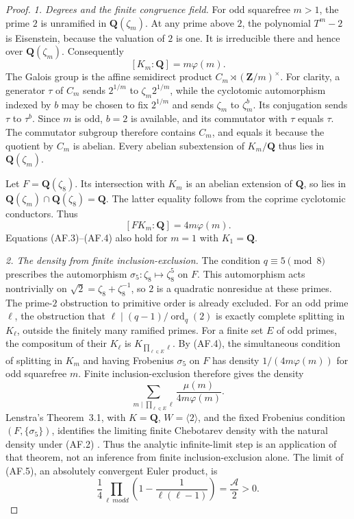 \documentclass[11pt,a4paper]{article}
\begin{document}
\begin{proof}
\emph{1. Degrees and the finite congruence field.}
For odd squarefree $m>1$, the prime $2$ is unramified in
$\mathbf Q(\zeta_m)$. At any prime above $2$, the polynomial
$T^m-2$ is Eisenstein, because the valuation of $2$ is one.
It is irreducible there and hence over $\mathbf Q(\zeta_m)$.
Consequently
\[
                         [K_m:\mathbf Q]=m\varphi(m).
                                                               \tag{AF.3}
\]
The Galois group is the affine semidirect product
$C_m\rtimes(\mathbf Z/m)^\times$. For clarity, a generator
$\tau$ of $C_m$ sends $2^{1/m}$ to $\zeta_m2^{1/m}$, while the
cyclotomic automorphism indexed by $b$ may be chosen to fix
$2^{1/m}$ and sends $\zeta_m$ to $\zeta_m^b$.
Its conjugation sends $\tau$ to $\tau^b$. Since $m$ is odd,
$b=2$ is available, and its commutator with $\tau$ equals
$\tau$. The commutator subgroup therefore contains $C_m$,
and equals it because the quotient by $C_m$ is abelian.
Every abelian subextension of $K_m/\mathbf Q$ thus lies in
$\mathbf Q(\zeta_m)$.

Let $F=\mathbf Q(\zeta_8)$. Its intersection with $K_m$ is an
abelian extension of $\mathbf Q$, so lies in
$\mathbf Q(\zeta_m)\cap\mathbf Q(\zeta_8)=\mathbf Q$.
The latter equality follows from the coprime cyclotomic conductors.
Thus
\[
                       [FK_m:\mathbf Q]=4m\varphi(m).
                                                               \tag{AF.4}
\]
Equations (AF.3)--(AF.4) also hold for $m=1$ with $K_1=\mathbf Q$.

\emph{2. The density from finite inclusion-exclusion.}
The condition $q\equiv5\pmod8$ prescribes the automorphism
$\sigma_5:\zeta_8\mapsto\zeta_8^5$ on $F$. This automorphism
acts nontrivially on $\sqrt2=\zeta_8+\zeta_8^{-1}$, so $2$ is a
quadratic nonresidue at these primes. The prime-$2$ obstruction
to primitive order is already excluded.
For an odd prime $\ell$, the obstruction that
$\ell\mid(q-1)/\operatorname{ord}_q(2)$ is exactly complete
splitting in $K_\ell$, outside the finitely many ramified primes.
For a finite set $E$ of odd primes, the compositum of their
$K_\ell$ is $K_{\prod_{\ell\in E}\ell}$.
By (AF.4), the simultaneous condition of splitting in $K_m$ and
having Frobenius $\sigma_5$ on $F$ has density
$1/(4m\varphi(m))$ for odd squarefree $m$.
Finite inclusion-exclusion therefore gives the density
\[
 \sum_{m\mid\prod_{\ell\in E}\ell}
               \frac{\mu(m)}{4m\varphi(m)}.
                                                               \tag{AF.5}
\]
Lenstra's Theorem~3.1, with $K=\mathbf Q$, $W=\langle2\rangle$,
and the fixed Frobenius condition $(F,\{\sigma_5\})$, identifies
the limiting finite Chebotarev density with the natural density
under (AF.2) \cite[\S2 and Theorem~3.1]{Lenstra1977}.
Thus the analytic infinite-limit step is an application of that
theorem, not an inference from finite inclusion-exclusion alone.
The limit of (AF.5), an absolutely convergent Euler product, is
\[
 \frac14\prod_{\ell\ {
m odd}}
                \left(1-\frac1{\ell(\ell-1)}\right)
                         =\frac{\mathcal A}{2}>0.
\]


\end{proof}
\end{document}
